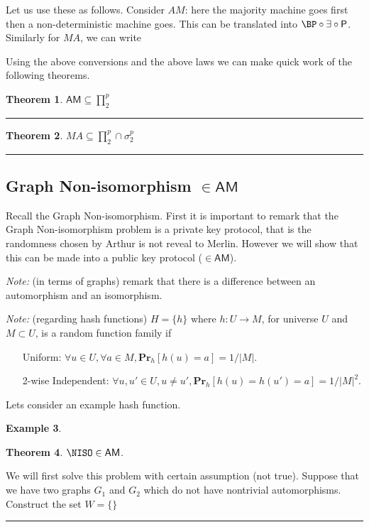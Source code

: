 \documentclass[twoside]{article}
\newcounter{lecnum}
\newtheorem{theorem}{Theorem}[lecnum]
\newtheorem{example}[theorem]{Example}
\newenvironment{proof}{{\bf Proof:}}{\hfill\rule{2mm}{2mm}}
\def\Pr{\mathbf{Pr}}
\def\P{\mathsf{P}}
\def\AM{\mathsf{AM}}
\begin{document}
Let us use these as follows. Consider $AM$: here the majority machine goes first then a non-deterministic machine goes. This can be translated into $\BP \circ \exists \circ \P$. Similarly for $MA$, we can write 


Using the above conversions and the above laws we can make quick work of the following theorems.
\begin{theorem}
$\AM \subseteq \prod_2^p$
\end{theorem}
\begin{proof}

\end{proof}

\begin{theorem}
$MA \subseteq \prod_2^p \cap \sigma_2^p$
\end{theorem}
\begin{proof}

\end{proof}

\subsection{Graph Non-isomorphism $\in \AM$}
Recall the Graph Non-isomorphism. First it is important to remark that the Graph Non-isomorphism problem is a private key protocol, that is the randomness chosen by Arthur is not reveal to Merlin. However we will show that this can be made into a public key protocol ($\in \AM$).

\emph{Note:} (in terms of graphs) remark that there is a difference between an automorphism and an isomorphism.

\emph{Note:} (regarding hash functions) $H = \{h\}$ where $h: U \rightarrow M$, for universe $U$ and $M \subset U$, is a random function family if 
\begin{enumerate}
\item[Uniform:] $\forall u \in U, \forall a \in M, \Pr_h[h(u) = a] = 1/|M|$.
\item[2-wise Independent:] $\forall u, u' \in U, u \neq u', \Pr_h[h(u) = h(u') = a] = 1/|M|^2$.
\end{enumerate}   

Lets consider an example hash function. 
\begin{example}

\end{example}

\begin{theorem}
$\NISO \in \AM$.
\end{theorem}
\begin{proof}
We will first solve this problem with certain assumption (not true). Suppose that we have two graphs $G_1$ and $G_2$ which do not have nontrivial automorphisms. Construct the set $W = \{\}$
\end{proof}
\end{document}
